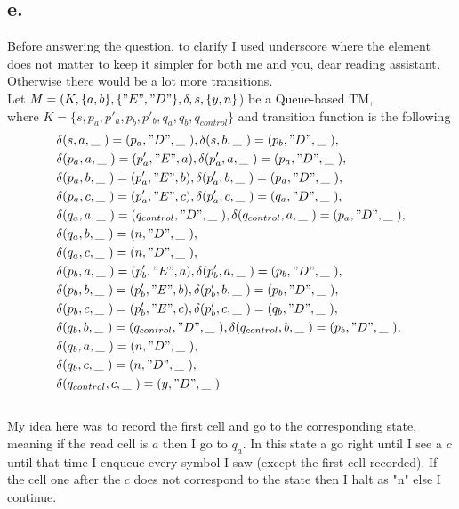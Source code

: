 \documentclass[12pt]{article}
\begin{document}
\subsection*{e.}
Before answering the question, to clarify I used underscore where the element does not matter to keep it simpler for both me and you, dear reading assistant. Otherwise there would be a lot more transitions. \\
Let $M=(K,\{a,b\},\{"E","D"\},\delta,s,\{y,n\}$) be a Queue-based TM, \\
where $K=\{s,p_a,p'_a,p_b,p'_b,q_a,q_b,q_{control}\}$ and transition function is the following\\
\begin{equation}
\begin{split}
	& \delta(s,a,\_\ ) = (p_a,"D",\_\ ),  \delta(s,b,\_\ ) = (p_b,"D",\_\ ), \\
	& \delta(p_a,a,\_\ ) = (p'_a,"E",a), \delta(p'_a,a,\_\ ) = (p_a,"D",\_\ ), \\
	& \delta(p_a,b,\_\ ) = (p'_a,"E",b), \delta(p'_a,b,\_\ ) = (p_a,"D",\_\ ), \\
	& \delta(p_a,c,\_\ ) = (p'_a,"E",c), \delta(p'_a,c,\_\ ) = (q_a,"D",\_\ ), \\
	& \delta(q_a,a,\_\ ) = (q_{control},"D",\_\ ), \delta(q_{control},a,\_\ ) = (p_a,"D",\_\ ), \\
	& \delta(q_a,b,\_\ ) = (n,"D",\_\ ), \\
	& \delta(q_a,c,\_\ ) = (n,"D",\_\ ), \\
	& \delta(p_b,a,\_\ ) = (p'_b,"E",a), \delta(p'_b,a,\_\ ) = (p_b,"D",\_\ ), \\
	& \delta(p_b,b,\_\ ) = (p'_b,"E",b), \delta(p'_b,b,\_\ ) = (p_b,"D",\_\ ), \\
	& \delta(p_b,c,\_\ ) = (p'_b,"E",c), \delta(p'_b,c,\_\ ) = (q_b,"D",\_\ ), \\
	& \delta(q_b,b,\_\ ) = (q_{control},"D",\_\ ), 	\delta(q_{control},b,\_\ ) = (p_b,"D",\_\ ), \\
	& \delta(q_b,a,\_\ ) = (n,"D",\_\ ), \\
	& \delta(q_b,c,\_\ ) = (n,"D",\_\ ), \\
	& \delta(q_{control},c,\_\ ) = (y,"D",\_\ ) 
\end{split}
\end{equation} \\
My idea here was to record the first cell and go to the corresponding state, meaning if the read cell is $a$ then I go to $q_a$. In this state a go right until I see a $c$ until that time I enqueue every symbol I saw (except the first cell recorded). If the cell one after the $c$ does not correspond to the state then I halt as "n" else I continue. \\
\end{document}
